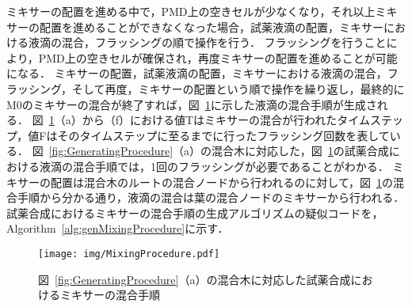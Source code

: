 \newpage
ミキサーの配置を進める中で，PMD上の空きセルが少なくなり，それ以上ミキサーの配置を進めることができなくなった場合，試薬液滴の配置，ミキサーにおける液滴の混合，フラッシングの順で操作を行う．
フラッシングを行うことにより，PMD上の空きセルが確保され，再度ミキサーの配置を進めることが可能になる．
ミキサーの配置，試薬液滴の配置，ミキサーにおける液滴の混合，フラッシング，そして再度，ミキサーの配置という順で操作を繰り返し，最終的にM0のミキサーの混合が終了すれば，図~\ref{fig:MixingProcedure}に示した液滴の混合手順が生成される．
図~\ref{fig:MixingProcedure}（a）から（f）における値Tはミキサーの混合が行われたタイムステップ，値Fはそのタイムステップに至るまでに行ったフラッシング回数を表している．
図~\ref{fig:GeneratingProcedure}（a）の混合木に対応した，図~\ref{fig:MixingProcedure}の試薬合成における液滴の混合手順では，1回のフラッシングが必要であることがわかる．
ミキサーの配置は混合木のルートの混合ノードから行われるのに対して，図~\ref{fig:MixingProcedure}の混合手順から分かる通り，液滴の混合は葉の混合ノードのミキサーから行われる．
試薬合成におけるミキサーの混合手順の生成アルゴリズムの疑似コードを，Algorithm~\ref{alg:genMixingProcedure}に示す．

\begin{figure}[tbp]
    \centering\texttt{[image: img/MixingProcedure.pdf]}
    \caption{図~\ref{fig:GeneratingProcedure}（a）の混合木に対応した試薬合成におけるミキサーの混合手順}
    \label{fig:MixingProcedure}
\end{figure}

